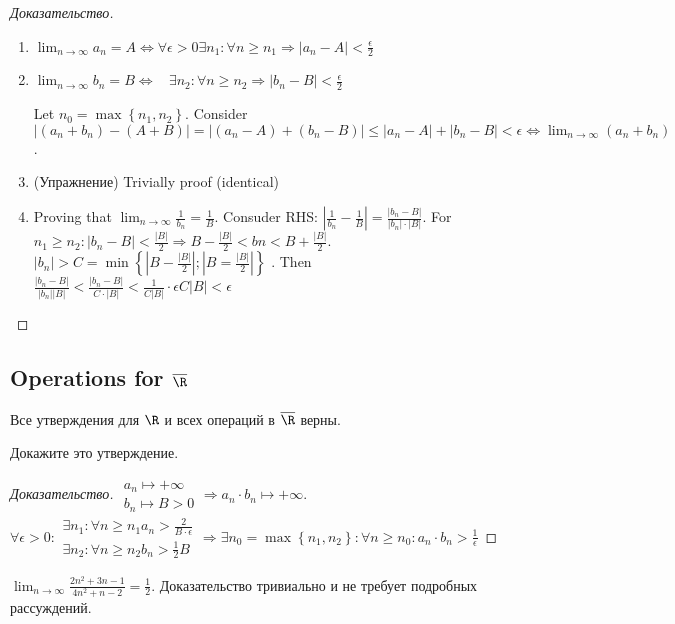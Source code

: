 \begin{proof}[Доказательство]
	\begin{enumerate}
		\item $\lim_{n \to \infty} a_n = A \Leftrightarrow \forall \epsilon > 0 \exists n_1: \forall n \geq n_1 \Rightarrow \left| a_n - A \right| < \frac{\epsilon}{2}$
		\item $\lim_{n \to \infty} b_n = B \Leftrightarrow \ \ \ \ \exists n_2: \forall n \geq n_2 \Rightarrow \left| b_n - B \right| < \frac{\epsilon}{2}$ 

			Let $n_0 = \max \left\{ n_1, n_2 \right \} $. Consider $\left| (a_n + b_n) - \left( A + B \right)  \right| = \left| \left( a_n - A \right) + \left( b_n - B \right)  \right| \leq \left| a_n - A \right| + \left| b_n - B \right| < \epsilon  \Leftrightarrow \lim_{n \to \infty} (a_n + b_n)$.

		\item (Упражнение) Trivially proof (identical)  
	\item Proving that $\lim_{n \to \infty} \frac{1}{b_n} = \frac{1}{B}$. Consuder RHS: $\left| \frac{1}{b_n} - \frac{1}{B} \right| = \frac{\left| b_n - B \right| }{|b_n| \cdot |B|} $. For $n_1 \geq n_2: \left| b_n - B \right| < \frac{|B|}{2} \Rightarrow B - \frac{|B|}{2} < bn < B + \frac{|B|}{2}$. $\left| b_n \right| > C = \min \left\{ \left| B - \frac{\left| B \right| }{2} \right| ; \left| B = \frac{\left| B \right| }{2} \right|  \right \} $ . Then  $\frac{\left| b_n - B \right| }{|b_n| |B|} < \frac{|b_n - B|}{C \cdot |B|} < \frac{1}{C |B|} \cdot \epsilon C |B| < \epsilon$
	\end{enumerate}
\end{proof}

\subsection{Operations for $\overline{\R}$}

\begin{proposition}[]
	Все утверждения для $\R$ и всех операций в  $\overline{\R}$ верны.
\end{proposition}

\begin{exercise}
	Докажите это утверждение.
\end{exercise}

\begin{proof}[Доказательство]
	$\begin{gathered}
		a_n \mapsto +\infty \\
		b_n \mapsto B > 0 
	\end{gathered} \Rightarrow a_n \cdot b_n \mapsto +\infty$. $\forall \epsilon > 0: \begin{gathered}
		\exists n_1: \forall n \geq n_1 a_n > \frac{2}{B \cdot \epsilon} \\
		\exists n_2: \forall n \geq n_2 b_n > \frac{1}{2} B
	\end{gathered} \Rightarrow \exists n_0 = \max \left\{ n_1, n_2 \right \} : \forall n \geq n_0: a_n \cdot b_n > \frac{1}{\epsilon}$
\end{proof}

\begin{example}[]
	$\lim_{n \to \infty} \frac{2n^2 + 3n - 1}{ 4n^2 + n - 2} = \frac{1}{2}$. Доказательство тривиально и не требует подробных рассуждений.
\end{example}
